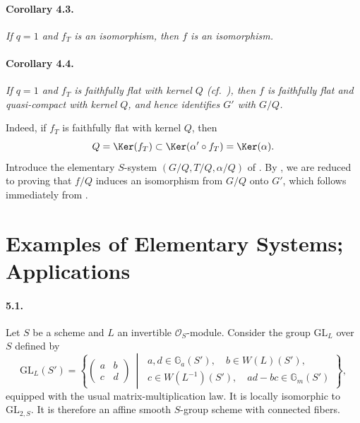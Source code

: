 \paragraph{\textbf{Corollary 4.3.}}
\emph{If \(q=1\) and \(f_T\) is an isomorphism, then \(f\) is an
isomorphism.}

\paragraph{\textbf{Corollary 4.4.}}
\emph{If \(q=1\) and \(f_T\) is faithfully flat with kernel \(Q\)
\textup{(cf.\ )}, then \(f\) is faithfully flat and
quasi-compact with kernel \(Q\), and hence identifies \(G'\) with
\(G/Q\).}

Indeed, if \(f_T\) is faithfully flat with kernel \(Q\), then
\[
  Q=\Ker(f_T)
  \subset\Ker(\alpha'\circ f_T)
  =\Ker(\alpha).
\]
Introduce the elementary \(S\)-system
\((G/Q,T/Q,\alpha/Q)\) of .  By , we are reduced to proving
that \(f/Q\) induces an isomorphism from \(G/Q\) onto \(G'\), which
follows immediately from .



\section{Examples of Elementary Systems; Applications}

\paragraph{\textbf{5.1.}}
Let \(S\) be a scheme and \(L\) an invertible
\(\mathcal O_S\)-module.  Consider the group \(\mathrm{GL}_L\) over
\(S\) defined by
\[
 \mathrm{GL}_L(S')
 =
 \left\{
 \begin{pmatrix}a&b\\c&d\end{pmatrix}
 \ \middle|\
 \begin{array}{l}
 a,d\in\mathbb G_a(S'),\quad b\in W(L)(S'),\\
 c\in W(L^{-1})(S'),\quad ad-bc\in\mathbb G_m(S')
 \end{array}
 \right\},
\]
equipped with the usual matrix-multiplication law.  It is locally
isomorphic to \(\mathrm{GL}_{2,S}\).  It is therefore an affine smooth
\(S\)-group scheme with connected fibers.

